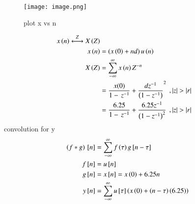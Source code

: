 \documentclass[journal,12pt,twocolumn]{IEEEtran}
\theoremstyle{remark}
\begin{document}
\begin{figure}
    \centering
    \texttt{[image: image.png]}
    \caption{plot x vs n}
    \label{fig:enter-label}
\end{figure}
\begin{align}
x\brak{n}\overset{Z}{\longleftrightarrow}  X\brak{Z}
\\x\brak{n}&=\brak{x\brak{0}+nd}u\brak{n}
\\X\brak{Z}&=\sum_{-\infty}^{\infty}x\brak{n}Z^{-n}\
\\&=\frac{x(0)}{1-\,z^{-1}}+\frac{dz^{-1}}{\brak{1-{z^{-1}}}}^2\:\:,|z|>|r|
\\&=\frac{6.25}{1-\,z^{-1}}+\frac{6.25z^{-1}}{\brak{1-{z^{-1}}}^2}\:\:,|z|>|r|
\end{align}
convolution for y
\begin{align}
\left(f*g\right){}\left[n\right]&=\sum_{-\infty}^{\infty}{f\left(\tau\right)g{}\left[n-\tau\right]}
\\f{}\left[n\right]&=u{}\left[n\right]
\\g{}\left[n\right]&=x{}\left[n\right]=x\left(0\right)+6.25n
\\y{}\left[n\right]&=\sum_{-\infty}^{\infty}{u{}\left[\tau\right]\left(x\left(0\right)+\left(n-\tau\right)\left(6.25\right)\right)}
\end{align}
 
\end{document}
